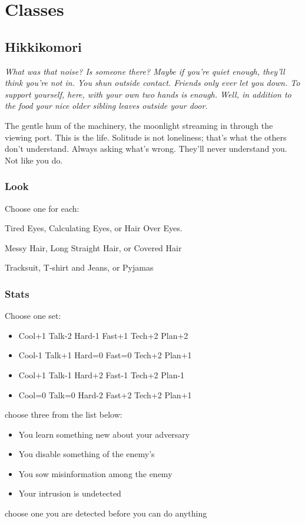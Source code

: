 \section{Classes}

\subsection{Hikkikomori}
{\itshape What was that noise? Is someone there? Maybe if you're quiet enough, they'll think you're not in. You shun outside contact. Friends only ever let you down. To support yourself, here, with your own two hands is enough. Well, in addition to the food your nice older sibling leaves outside your door.

The gentle hum of the machinery, the moonlight streaming in through the viewing port. This is the life. Solitude is not loneliness; that's what the others don't understand. Always asking what's wrong. They'll never understand you. Not like you do.}

\subsubsection{Look}
Choose one for each:

Tired Eyes, Calculating Eyes, or Hair Over Eyes.

Messy Hair, Long Straight Hair, or Covered Hair

Tracksuit, T-shirt and Jeans, or Pyjamas

\subsubsection{Stats}
Choose one set:
\begin{itemize}
\setlength\itemsep{0em}
\item Cool+1 Talk-2 Hard-1 Fast+1 Tech+2 Plan+2
\item Cool-1 Talk+1 Hard=0 Fast=0 Tech+2 Plan+1
\item Cool+1 Talk-1 Hard+2 Fast-1 Tech+2 Plan-1
\item Cool=0 Talk=0 Hard-2 Fast+2 Tech+2 Plan+1
\end{itemize}

{choose three from the list below:
\begin{itemize}
\item You learn something new about your adversary
\item You disable something of the enemy's
\item You sow misinformation among the enemy
\item Your intrusion is undetected
\end{itemize}}
{choose one}
{you are detected before you can do anything}

